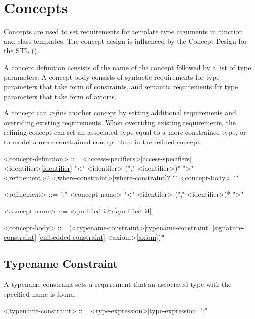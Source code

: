 \documentclass[a4paper,oneside,11pt]{article}
\begin{document}
\section{Concepts}

Concepts are used to set requirements for template type arguments in function and class templates.
The concept design is influenced by the Concept Design for the STL (\cite{STLCONCEPTS}).

A concept definition consists of the name of the concept followed by a list of type parameters.
A concept body consists of syntactic requirements for type parameters that take form of constraints,
and semantic requirements for type parameters that take form of axioms.

A concept can \emph{refine} another concept by setting additional requirements and overriding existing requirements.
When overriding existing requirements, the refining concept can set an associated type equal to a more constrained type,
or to model a more constrained concept than in the refined concept.

\begin{grammar}
\label{concept-definition}<concept-definition> ::= <access-specifiers>\ref{access-specifiers}\\
 <identifier>\ref{identifier} "<" <identifer> ("," <identifier>)* ">"\\
<refinement>? <where-constraint>\ref{where-constraint}? "{" <concept-body> "}"

<refinement> ::= ":" <concept-name> "<" <identifer> ("," <identifier>)* ">"

\label{concept-name}<concept-name> ::= <qualified-id>\ref{qualified-id}

<concept-body> ::= (<typename-constraint>\ref{typename-constraint}
\ref{signature-constraint}
\ref{embedded-constraint}
\alt <axiom>\ref{axiom})*
\end{grammar}

\subsection{Typename Constraint}

A typename constraint sets a requirement that an associated type with the specified name is found.

\begin{grammar}
\label{typename-constraint}<typename-constraint> ::=  <type-expression>\ref{type-expression} ";"
\end{grammar}
\end{document}
